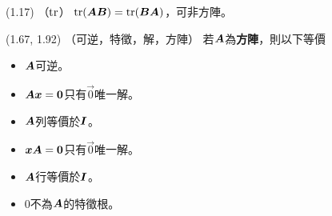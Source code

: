 \item \begin{theorem}{(1.17)} （$\operatorname{tr}$）
    $\operatorname{tr}(\boldsymbol{AB}) = \operatorname{tr}(\boldsymbol{BA})$，可非方陣。
\end{theorem}

\item \begin{theorem}{(1.67, 1.92)} （可逆，特徵，解，方陣）
    若$\boldsymbol{A}$為\textbf{方陣}，則以下等價
    \begin{itemize}
        \item $\boldsymbol{A}$可逆。
        \item $\boldsymbol{A}\boldsymbol{x} = \boldsymbol{0}$只有$\vec{0}$唯一解。
        \item $\boldsymbol{A}$列等價於$\boldsymbol{I}$。
        \item $\boldsymbol{x}\boldsymbol{A} = \boldsymbol{0}$只有$\vec{0}$唯一解。
        \item $\boldsymbol{A}$行等價於$\boldsymbol{I}$。
        \item $0$不為$\boldsymbol{A}$的特徵根。
    \end{itemize}
\end{theorem}
